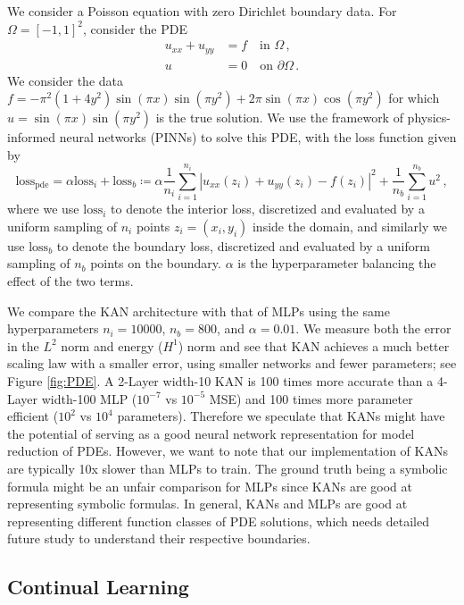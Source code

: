 \documentclass{article}
\numberwithin{equation}{section}
\numberwithin{figure}{section}
\begin{document}
We consider a Poisson equation with zero Dirichlet boundary data. For $\Omega=[-1,1]^2$, consider the PDE 
\begin{equation}
    \begin{aligned}
        u_{xx}+u_{yy}&=f\quad \text{in}\,\,\Omega\,,\\u&=0\quad \text{on}\,\,\partial\Omega\,.
    \end{aligned}
\end{equation}
We consider the data $f=-\pi^2(1+4y^2)\sin(\pi x)\sin(\pi y^2)+2\pi\sin(\pi x)\cos(\pi y^2)$ for which $u=\sin(\pi x)\sin(\pi y^2)$ is the true solution. We use the framework of physics-informed neural networks (PINNs) \cite{raissi2019physics, karniadakis2021physics} to solve this PDE, with the loss function given by $$\text{loss}_{\text{pde}}=\alpha\text{loss}_i+\text{loss}_b\coloneqq\alpha\frac{1}{n_i}\sum_{i=1}^{n_i}|u_{xx}(z_i)+u_{yy}(z_i)-f(z_i)|^2+\frac{1}{n_b}\sum_{i=1}^{n_b}u^2\,,$$
where we use $\text{loss}_i$ to denote the interior loss, discretized and evaluated by a uniform sampling of $n_i$ points $z_i=(x_i,y_i)$ inside the domain, and similarly we use $\text{loss}_b$ to denote the boundary loss, discretized and evaluated by a uniform sampling of $n_b$ points on the boundary. $\alpha$ is the hyperparameter balancing the effect of the two terms.

We compare the KAN architecture with that of MLPs using the same hyperparameters $n_i=10000$, $n_b=800$, and $\alpha=0.01$. We measure both the error in the $L^2$ norm and energy ($H^1$) norm and see that KAN achieves a much better scaling law with a smaller error, using smaller networks and fewer parameters; see Figure \ref{fig:PDE}. A 2-Layer width-10 KAN is 100 times more accurate than a 4-Layer width-100 MLP ($10^{-7}$ vs $10^{-5}$ MSE) and 100 times more parameter efficient ($10^2$ vs $10^4$ parameters).  Therefore we speculate that KANs might have the potential of serving as a good neural network representation for model reduction of PDEs. However, we want to note that our implementation of KANs are typically 10x slower than MLPs to train. The ground truth being a symbolic formula might be an unfair comparison for MLPs since KANs are good at representing symbolic formulas.   In general, KANs and MLPs are good at representing different function classes of PDE solutions, which needs detailed future study to understand their respective boundaries.


\subsection{Continual Learning}\label{subsec:continual-learning}
\end{document}
